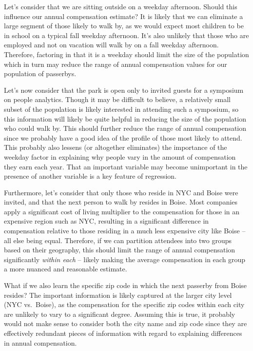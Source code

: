 \documentclass[
]{book}
\begin{document}
Let's consider that we are sitting outside on a weekday afternoon. Should this influence our annual compensation estimate? It is likely that we can eliminate a large segment of those likely to walk by, as we would expect most children to be in school on a typical fall weekday afternoon. It's also unlikely that those who are employed and not on vacation will walk by on a fall weekday afternoon. Therefore, factoring in that it is a weekday should limit the size of the population which in turn may reduce the range of annual compensation values for our population of passerbys.

Let's now consider that the park is open only to invited guests for a symposium on people analytics. Though it may be difficult to believe, a relatively small subset of the population is likely interested in attending such a symposium, so this information will likely be quite helpful in reducing the size of the population who could walk by. This should further reduce the range of annual compensation since we probably have a good idea of the profile of those most likely to attend. This probably also lessens (or altogether eliminates) the importance of the weekday factor in explaining why people vary in the amount of compensation they earn each year. That an important variable may become unimportant in the presence of another variable is a key feature of regression.

Furthermore, let's consider that only those who reside in NYC and Boise were invited, and that the next person to walk by resides in Boise. Most companies apply a significant cost of living multiplier to the compensation for those in an expensive region such as NYC, resulting in a significant difference in compensation relative to those residing in a much less expensive city like Boise -- all else being equal. Therefore, if we can partition attendees into two groups based on their geography, this should limit the range of annual compensation significantly \emph{within each} -- likely making the average compensation in each group a more nuanced and reasonable estimate.

What if we also learn the specific zip code in which the next passerby from Boise resides? The important information is likely captured at the larger city level (NYC vs.~Boise), as the compensation for the specific zip codes within each city are unlikely to vary to a significant degree. Assuming this is true, it probably would not make sense to consider both the city name and zip code since they are effectively redundant pieces of information with regard to explaining differences in annual compensation.
\end{document}

